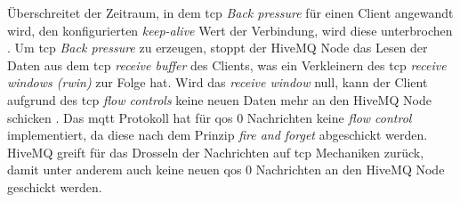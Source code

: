 Überschreitet der Zeitraum, in dem \ac{tcp} \textit{Back pressure} für einen Client angewandt wird, den konfigurierten \textit{keep-alive} Wert der Verbindung, wird diese unterbrochen \cite{ClusterOverloadProtection}.
Um \ac{tcp} \textit{Back pressure} zu erzeugen, stoppt der HiveMQ Node das Lesen der Daten aus dem \ac{tcp} \textit{receive buffer} des Clients, was ein Verkleinern des \ac{tcp} \textit{receive windows (rwin)} zur Folge hat. Wird das \textit{receive window} null, kann der Client aufgrund des \ac{tcp} \textit{flow controls} keine neuen Daten mehr an den HiveMQ Node schicken \cite[S.~219ff]{d.e.comerInternetworkingTCPIP2000}.
Das \ac{mqtt} Protokoll hat für \ac{qos} 0 Nachrichten keine \textit{flow control} implementiert, da diese nach dem Prinzip \textit{fire and forget} abgeschickt werden.
HiveMQ greift für das Drosseln der Nachrichten auf \ac{tcp} Mechaniken zurück, damit unter anderem auch keine neuen \ac{qos} 0 Nachrichten an den HiveMQ Node geschickt werden.

